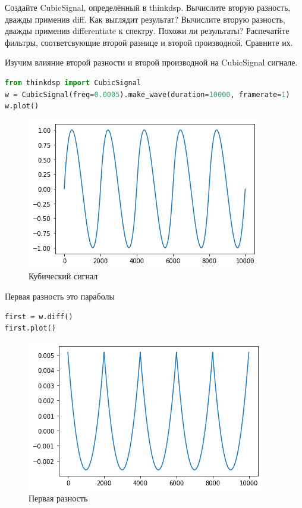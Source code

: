 Создайте CubicSignal, определённый в thinkdsp. Вычислите вторую разность, дважды применив diff. Как выглядит результат? Вычислите вторую разность, дважды применив differentiate к спектру. Похожи ли результаты? Распечатйте фильтры, соответсвующие второй разнице и второй производной. Сравните их.

Изучим влияние второй разности и второй производной на CubicSignal сигнале.

\begin{lstlisting}[language=Python]
from thinkdsp import CubicSignal
w = CubicSignal(freq=0.0005).make_wave(duration=10000, framerate=1)
w.plot()
\end{lstlisting}
\begin{figure}[H]
	\begin{center}
		\includegraphics[scale=1]{fig/lab09/lab09_11.png}
		\caption{Кубический сигнал}
	\end{center}
\end{figure}

Первая разность это параболы

\begin{lstlisting}[language=Python]
first = w.diff()
first.plot()
\end{lstlisting}
\begin{figure}[H]
	\begin{center}
		\includegraphics[scale=1]{fig/lab09/lab09_12.png}
		\caption{Первая разность}
	\end{center}
\end{figure}

